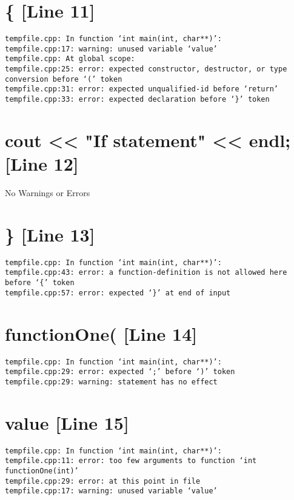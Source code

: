 \documentclass{article}
\begin{document}
\section{\{ [Line 11]}
\begin{verbatim}
tempfile.cpp: In function ‘int main(int, char**)’:
tempfile.cpp:17: warning: unused variable ‘value’
tempfile.cpp: At global scope:
tempfile.cpp:25: error: expected constructor, destructor, or type conversion before ‘(’ token
tempfile.cpp:31: error: expected unqualified-id before ‘return’
tempfile.cpp:33: error: expected declaration before ‘}’ token

\end{verbatim}



\section{cout << "If statement" << endl; [Line 12]}
No Warnings or Errors



\section{\} [Line 13]}
\begin{verbatim}
tempfile.cpp: In function ‘int main(int, char**)’:
tempfile.cpp:43: error: a function-definition is not allowed here before ‘{’ token
tempfile.cpp:57: error: expected ‘}’ at end of input

\end{verbatim}



\section{functionOne( [Line 14]}
\begin{verbatim}
tempfile.cpp: In function ‘int main(int, char**)’:
tempfile.cpp:29: error: expected ‘;’ before ‘)’ token
tempfile.cpp:29: warning: statement has no effect

\end{verbatim}



\section{value [Line 15]}
\begin{verbatim}
tempfile.cpp: In function ‘int main(int, char**)’:
tempfile.cpp:11: error: too few arguments to function ‘int functionOne(int)’
tempfile.cpp:29: error: at this point in file
tempfile.cpp:17: warning: unused variable ‘value’

\end{verbatim}
\end{document}
